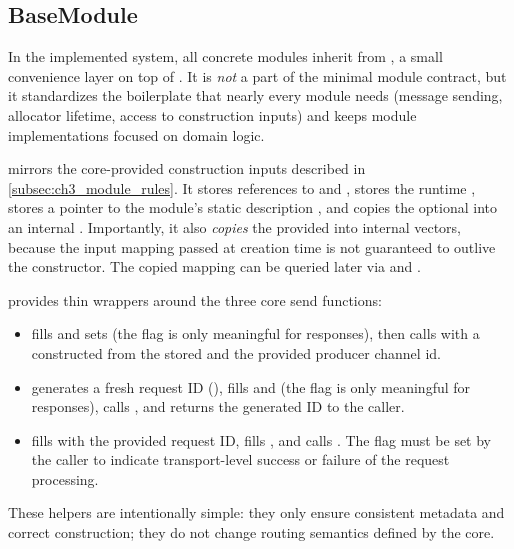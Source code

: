 \subsection{BaseModule} \label{subsec:ch3_basemodule}

In the implemented system, all concrete modules inherit from , a small convenience layer on top of . It is \emph{not} a part of the minimal module contract, but it standardizes the boilerplate that nearly every module needs (message sending, allocator lifetime, access to construction inputs) and keeps module implementations focused on domain logic.

 mirrors the core-provided construction inputs described in \autoref{subsec:ch3_module_rules}. It stores references to  and , stores the runtime , stores a pointer to the module's static description , and copies the optional  into an internal . Importantly, it also \emph{copies} the provided  into internal vectors, because the input mapping passed at creation time is not guaranteed to outlive the constructor. The copied mapping can be queried later via  and .

 provides thin wrappers around the three core send functions:
\begin{itemize}
    \item {} fills  and sets  (the  flag is only meaningful for responses), then calls  with a  constructed from the stored  and the provided producer channel id.
    \item {} generates a fresh request ID (), fills  and  (the  flag is only meaningful for responses), calls , and returns the generated ID to the caller.
    \item {} fills  with the provided request ID, fills , and calls . The  flag must be set by the caller to indicate transport-level success or failure of the request processing.
\end{itemize}
These helpers are intentionally simple: they only ensure consistent metadata and correct  construction; they do not change routing semantics defined by the core.

